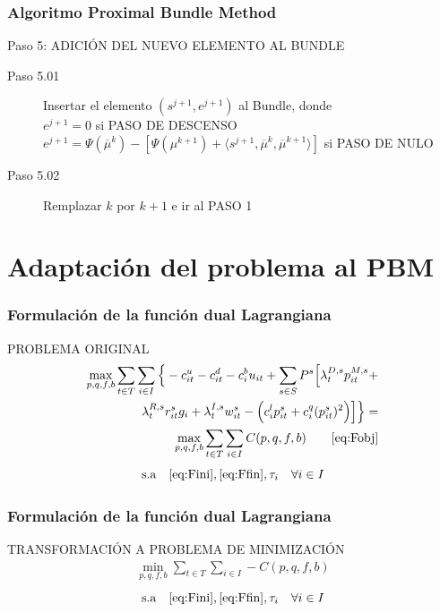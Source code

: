 \documentclass[xcolor=dvipsnames, utf8, spanish]{beamer} %
\begin{document}
\begin{frame}
	\frametitle{Algoritmo Proximal Bundle Method}
	\begingroup
		\begin{block} {Paso 5: ADICIÓN DEL NUEVO ELEMENTO AL BUNDLE}
			\begin{description}
				\item [Paso 5.01] Insertar el elemento $(s^{j+1},e^{j+1})$ al Bundle, donde \\
				$e^{j+1}=0$ si PASO DE DESCENSO \\
				$e^{j+1}=\Psi(\overline{\mu}^{k})-[\Psi({\mu}^{k+1})+\langle 	s^{j+1},\overline{\mu}^{k},\overline{\mu}^{k+1} \rangle]$ si PASO DE NULO		
				\item [Paso 5.02] Remplazar $k$ por $k+1$ e ir al PASO 1
			\end{description}
		\end{block}
	\endgroup
\end{frame}

\section{Adaptación del problema al PBM}

\begin{frame}
	\frametitle{Formulación de la función dual Lagrangiana}
	\begingroup
		\begin{block} {PROBLEMA ORIGINAL}
			\begin{align}
				\max_{p,q,f,b} \sum_{t \in T} \sum_{i \in I} \Big\{-c^{u}_{it}-c^{d}_{it}-c^{b}_{i}u_{it}+\sum_{s\in S}P^s \Big[ \lambda^{D,s}_t p^{M,s}_{it}+ \nonumber\\
				\lambda^{R,s}_t r^{s}_{it} g_i + \lambda^{I,s}_t w^{s}_{it}-\Big( c^l_i p^s_{it} + c^q_i ( p^s_{it})^2 \Big) \Big] \Big\}= \nonumber\\		
				\max_{p,q,f,b} \sum_{t \in T} \sum_{i \in I} C(p,q,f,b) \nonumber \quad \quad \eqref{eq:Fobj}
			\end{align}
			\begin{displaymath}
				\text{s.a} \quad \eqref{eq:Fini}, \eqref{eq:Ffin}, \tau_i \quad \forall i \in I
			\end{displaymath}
		\end{block}
	\endgroup
\end{frame}


\begin{frame}
	\frametitle{Formulación de la función dual Lagrangiana}
	\begingroup
		\begin{block} {TRANSFORMACIÓN A PROBLEMA DE MINIMIZACIÓN}
			\begin{align}
				\min_{p,q,f,b} \sum_{t \in T} \sum_{i \in I} -C(p,q,f,b)
			\end{align}
			\begin{displaymath}
				\text{s.a} \quad \eqref{eq:Fini}, \eqref{eq:Ffin}, \tau_i \quad \forall i \in I
			\end{displaymath}
		\end{block}
	\endgroup
\end{frame}
\end{document}
